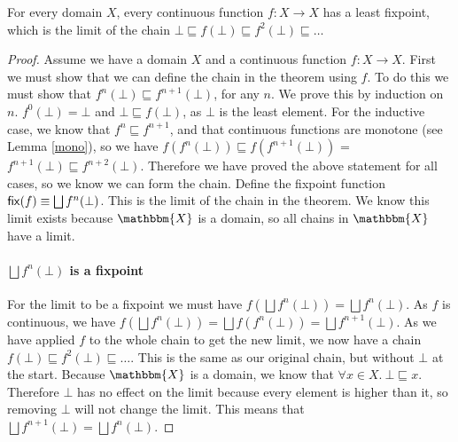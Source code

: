 
\begin{thm}
For every domain $X$, every continuous function $f : X \to X$ has a least fixpoint, which is the limit of the chain $\bot \sqsubseteq f(\bot) \sqsubseteq f^2(\bot) \sqsubseteq \dots$
\end{thm}

\begin{proof}
Assume we have a domain $X$ and a continuous function $f: X \to X$. First we must show that we can define the chain in the theorem using $f$. To do this we must show that $f^n(\bot) \sqsubseteq f^{n+1}(\bot)$, for any $n$. We prove this by induction on $n$. $f^0(\bot) = \bot$ and $\bot \sqsubseteq f(\bot)$, as $\bot$ is the least element. For the inductive case, we know that $f^{n} \sqsubseteq f^{n+1}$, and that continuous functions are monotone (see Lemma \ref{mono}), so we have $f(f^{n}(\bot)) \sqsubseteq f(f^{n+1}(\bot))$ = $f^{n+1}(\bot) \sqsubseteq f^{n+2}(\bot)$. Therefore we have proved the above statement for all cases, so we know we can form the chain. Define the fixpoint function $\operatorname{\mathsf{fix}}(f) \equiv \bigsqcup f^n (\bot)$. This is the limit of the chain in the theorem. We know this limit exists because $\mathbbm{X}$ is a domain, so all chains in $\mathbbm{X}$ have a limit. %



\paragraph{$\bigsqcup f^n (\bot)$ is a fixpoint}
For the limit to be a fixpoint we must have  $f( \bigsqcup f^n (\bot)) =  \bigsqcup f^n (\bot)$.  As $f$ is continuous, we have $f( \bigsqcup f^n (\bot)) = \bigsqcup f(f^n(\bot)) = \bigsqcup f^{n+1}(\bot)$. As we have applied $f$ to the whole chain to get the new limit, we now have a chain $f(\bot)  \sqsubseteq f^2(\bot) \sqsubseteq \dots$. This is the same as our original chain, but without $\bot$ at the start. Because $\mathbbm{X}$ is a domain, we know that $\forall x \in X. \ \bot \sqsubseteq x$. Therefore $\bot$ has no effect on the limit because every element is higher than it, so removing $\bot$ will not change the limit. This means that $\bigsqcup f^{n+1} (\bot) = \bigsqcup f^n(\bot)$.


\end{proof}
